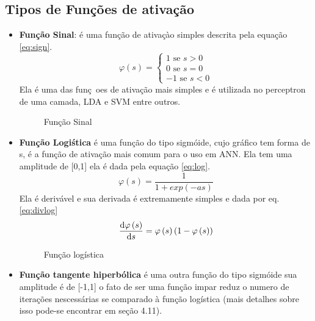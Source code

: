 \subsection{Tipos de Fun\c{c}\~oes de ativa\c{c}\~ao}
\begin{itemize}
	\item \textbf{Fun\c{c}\~ao Sinal}: \'e uma fun\c{c}\~ao de ativa\c{c}\`ao simples descrita pela equa\c{c}\~ao \ref{eq:sign}.
	\begin{equation}\label{eq:sign}
	\varphi \left( s \right) =\begin{cases}
	1 \text{ se } s > 0\\
	0 \text{ se } s = 0\\
	-1 \text{ se } s < 0
	\end{cases}
	\end{equation}
	Ela \'e uma das fun\c{c}~oes de ativa\c{c}\~ao mais simples e \'e utilizada no perceptron de uma camada, \ac{LDA} e \ac{SVM} entre outros.
	\begin{figure}[!h]
		\begin{center}
			\caption{Fun\c{c}\~ao Sinal}			
			
			\label{fig:funcaosinal}
		\end{center}	
	\end{figure}
	\item \textbf{Fun\c{c}\~ao Logi\'stica}
	\'e uma fun\c{c}\~ao do tipo sigm\'oide, cujo gr\'afico tem forma de s, \'e a fun\c{c}\~ao de ativa\c{c}\~ao mais comum para o uso em \ac{ANN}. Ela tem uma amplitude de [0,1] ela \'e dada pela equa\c{c}\~ao \ref{eq:log}.
	\begin{equation}\label{eq:log}
	\varphi \left( s \right) = \frac{1}{1+exp(-a s)}
	\end{equation}
	Ela \'e deriv\'avel e sua derivada \'e extremamente simples e dada por eq. \ref{eq:divlog}
	\begin{equation}\label{eq:divlog} 
	\dv{\varphi \left( s \right)}{s}  = \varphi \left( s \right)\left( 1 -  \varphi \left( s \right) \right)
	\end{equation}	
	\begin{figure}[!ht]
		\begin{center}
			\caption{Fun\c{c}\~ao log\'istica}			
			
			\label{fig:funcaologistica}
		\end{center}	
	\end{figure}
	\item \textbf{Fun\c{c}\~ao tangente hiperb\'olica} \'e uma outra fun\c{c}\~ao do tipo sigm\'oide sua amplitude \'e de [-1,1] o fato de ser uma fun\c{c}\~ao impar reduz o numero de itera\c{c}\~oes nescess\'arias se comparado \`a fun\c{c}\~ao log\'istica (mais detalhes sobre isso pode-se encontrar em \cite{Haykin2008} se\c{c}\~ao 4.11). 

\end{itemize}
